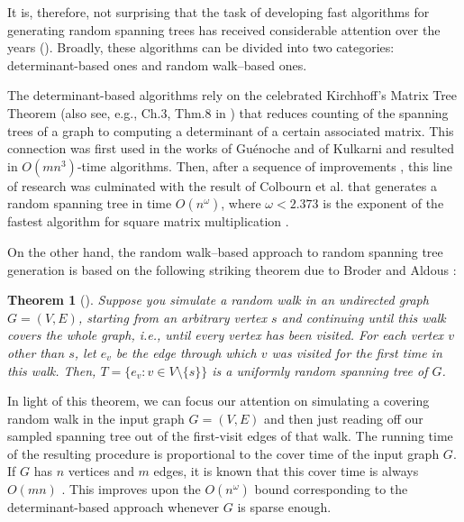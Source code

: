 \documentclass[11pt, letterpaper]{article}
\newtheorem{theorem}{Theorem}[section]
\begin{document}
It is, therefore, not surprising that the task of developing fast algorithms for generating random spanning trees has received considerable attention over the years (\cite{Guenoche83,Kulkarni90,ColbournDM88,ColbournDN89,ColbournMN96,Aldous90,Broder89,Wilson96,KelnerM09}). Broadly, these algorithms can be divided into two categories: determinant-based ones and random walk--based ones. 

The determinant-based algorithms rely on the celebrated Kirchhoff's Matrix Tree Theorem \cite{Kirchhoff47} (also see, e.g., Ch.3, Thm.8 in \cite{Bollobas79}) that reduces counting of the spanning trees of a graph to computing a determinant of a certain associated matrix. This connection was first used in the works of Gu\'enoche \cite{Guenoche83} and of Kulkarni \cite{Kulkarni90} and resulted in $O(mn^3)$-time algorithms. Then, after a sequence of improvements \cite{ColbournDM88,ColbournDN89}, this line of research was culminated with the result of Colbourn et al. \cite{ColbournMN96} that generates a random spanning tree in time $O(n^{\omega})$, where $\omega<2.373$ is the exponent of the fastest algorithm for square matrix multiplication \cite{CoppersmithW90,Vassilevska12}.

On the other hand, the random walk--based approach to random spanning tree generation is based on the following striking theorem due to Broder \cite{Broder89} and Aldous \cite{Aldous90}:


\begin{theorem}[\cite{Aldous90,Broder89}] \label{thm:rand_tree_via_rand_walk}
Suppose you simulate a random walk in an undirected graph $G=(V,E)$, starting from an arbitrary vertex $s$ and continuing until this walk covers the whole graph, i.e., until every vertex has been visited. For each vertex $v$ other than $s$, let $e_v$ be the edge through which $v$ was visited for the first time in this walk. Then, $T = \{ e_v : v \in V \setminus \{s\}\}$ is a uniformly random spanning tree of $G$.
\end{theorem}

In light of this theorem, we can focus our attention on simulating a covering random walk in the input graph $G=(V,E)$ and then just reading off our sampled spanning tree out of the first-visit edges of that walk. The running time of the resulting procedure is proportional to the cover time of the input graph $G$. If $G$ has $n$ vertices and $m$ edges, it is known that this cover time is always $O(mn)$ \cite{AleliunasKLLR79}. This improves upon the $O(n^\omega)$ bound corresponding to the determinant-based approach whenever $G$ is sparse enough. 
\end{document}
